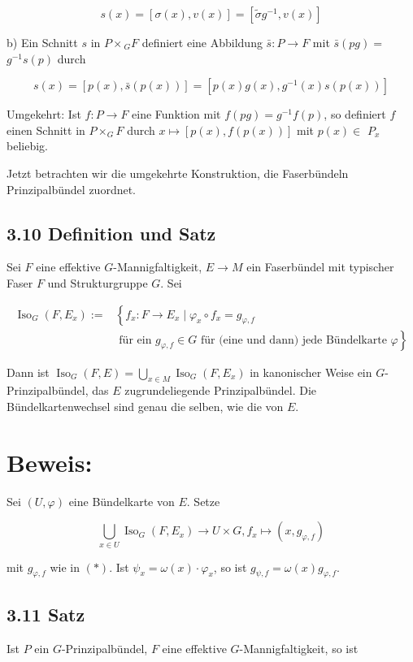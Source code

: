 \documentclass[10pt, letterpaper]{article}
\begin{document}
$$
s(x)=[\sigma(x), v(x)]=\left[\tilde{\sigma} g^{-1}, v(x)\right]
$$

b) Ein Schnitt $s$ in $P \times{ }_{G} F$ definiert eine Abbildung $\bar{s}: P \rightarrow F$ mit $\bar{s}(p g)=$ $g^{-1} s(p)$ durch

$$
s(x)=[p(x), \bar{s}(p(x))]=\left[p(x) g(x), g^{-1}(x) s(p(x))\right]
$$

Umgekehrt: Ist $f: P \rightarrow F$ eine Funktion mit $f(p g)=g^{-1} f(p)$, so definiert $f$ einen Schnitt in $P \times_{G} F$ durch $x \mapsto[p(x), f(p(x))]$ mit $p(x) \in$ $P_{x}$ beliebig.

Jetzt betrachten wir die umgekehrte Konstruktion, die Faserbündeln Prinzipalbündel zuordnet.

\subsection*{3.10 Definition und Satz}
Sei $F$ eine effektive $G$-Mannigfaltigkeit, $E \rightarrow M$ ein Faserbündel mit typischer Faser $F$ und Strukturgruppe $G$. Sei


\begin{align*}
\operatorname{Iso}_{G}\left(F, E_{x}\right):= & \left\{f_{x}: F \rightarrow E_{x} \mid \varphi_{x} \circ f_{x}=g_{\varphi, f}\right. \\
& \text { für ein } \left.g_{\varphi, f} \in G \text { für (eine und dann) jede Bündelkarte } \varphi\right\} \tag{*}
\end{align*}


Dann ist $\operatorname{Iso}_{G}(F, E)=\bigcup_{x \in M} \operatorname{Iso}_{G}\left(F, E_{x}\right)$ in kanonischer Weise ein $G$-Prinzipalbündel, das $E$ zugrundeliegende Prinzipalbündel. Die Bündelkartenwechsel sind genau die selben, wie die von $E$.

\section*{Beweis:}
Sei $(U, \varphi)$ eine Bündelkarte von $E$. Setze

$$
\bigcup_{x \in U} \operatorname{Iso}_{G}\left(F, E_{x}\right) \rightarrow U \times G, f_{x} \mapsto\left(x, g_{\varphi, f}\right)
$$

mit $g_{\varphi, f}$ wie in $(*)$. Ist $\psi_{x}=\omega(x) \cdot \varphi_{x}$, so ist $g_{\psi, f}=\omega(x) g_{\varphi, f}$.

\subsection*{3.11 Satz}
Ist $P$ ein $G$-Prinzipalbündel, $F$ eine effektive $G$-Mannigfaltigkeit, so ist
\end{document}
